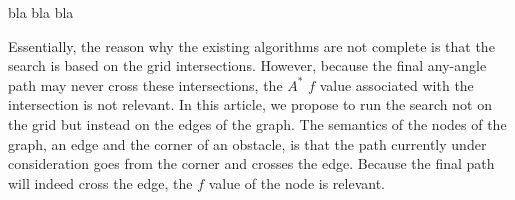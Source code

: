 bla bla bla

Essentially, the reason why the existing algorithms are not complete 
is that the search is based on the grid intersections.  
However, because the final any-angle path 
may never cross these intersections, 
the $A^*$ $f$ value associated with the intersection
is not relevant.  
In this article, we propose to run the search not on the grid 
but instead on the edges of the graph.  
The semantics of the nodes of the graph, 
an edge and the corner of an obstacle, 
is that the path currently under consideration 
goes from the corner and crosses the edge.  
Because the final path will indeed cross the edge, 
the $f$ value of the node is relevant.  

